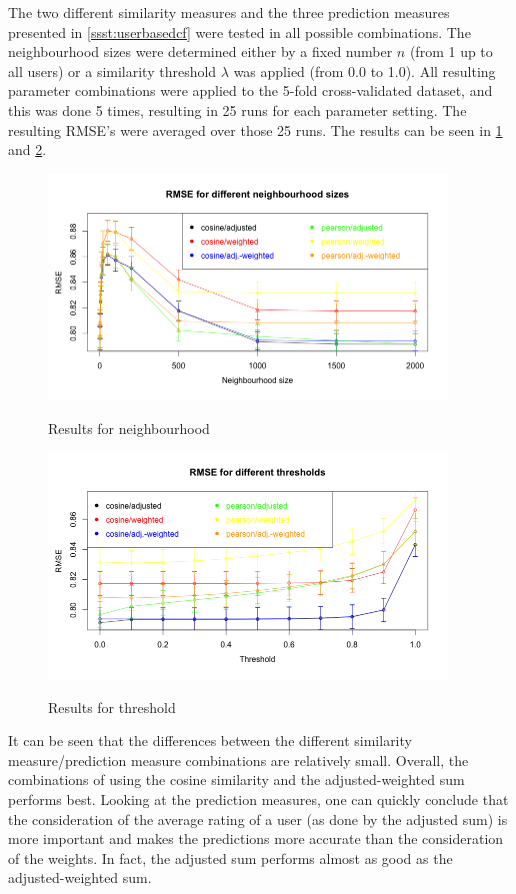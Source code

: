 The two different similarity measures and the three prediction measures presented in \ref{ssst:userbasedcf} were tested in all possible combinations. The neighbourhood sizes were determined either by a fixed number $n$ (from 1 up to all users) or a similarity threshold $\lambda$ was applied (from 0.0 to 1.0). All resulting parameter combinations were applied to the 5-fold cross-validated dataset, and this was done 5 times, resulting in 25 runs for each parameter setting. The resulting RMSE's were averaged over those 25 runs. The results can be seen in \ref{f:userbasedn} and \ref{f:userbasedt}.

\begin{figure}[!ht]
\centering
\includegraphics[width=400px]{./4-experiments/figures/USERBASED_N_V3.png}
\label{f:userbasedn}
\caption{Results for neighbourhood}
\end{figure}

\begin{figure}[!ht]
\includegraphics[width=400px]{./4-experiments/figures/USERBASED_T_V3.png}
\label{f:userbasedt}
\caption{Results for threshold}
\end{figure}

It can be seen that the differences between the different similarity measure/prediction measure combinations are relatively small. Overall, the combinations of using the cosine similarity and the adjusted-weighted sum performs best. Looking at the prediction measures, one can quickly conclude that the consideration of the average rating of a user (as done by the adjusted sum) is more important and makes the predictions more accurate than the consideration of the weights. In fact, the adjusted sum performs almost as good as the adjusted-weighted sum.

